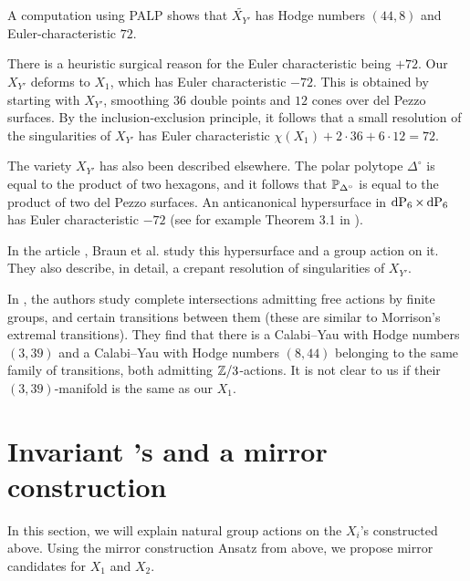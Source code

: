 A computation using PALP \cite{palp} shows that $\widetilde{X_{Y'}}$ has Hodge numbers $(44,8)$ and Euler-characteristic $72$. 

\begin{remark}
There is a heuristic surgical reason for the Euler characteristic being $+72$. Our $X_{Y'}$ deforms to $X_1$, which has Euler characteristic $-72$. This is obtained by starting with $X_{Y'}$, smoothing $36$ double points and $12$ cones over del Pezzo surfaces. By the inclusion-exclusion principle, it follows that a small resolution of the singularities of $X_{Y'}$ has Euler characteristic $\chi(X_1)+2\cdot 36 + 6 \cdot 12=72$.
\end{remark}

\begin{remark}
The variety $X_{Y'}$ has also been described elsewhere. The polar polytope $\Delta^{\circ}$ is equal to the product of two hexagons, and it follows that $\P_{\Delta^\circ}$ is equal to the product of two del Pezzo surfaces. An anticanonical hypersurface in $\dP6 \times \dP6$ has Euler characteristic $-72$ (see for example Theorem 3.1 in \cite{bestiary_hubsch}).

In the article \cite{braun_smallhodgenumbers}, Braun et al. study this hypersurface and a group action on it. They also describe, in detail, a crepant resolution of singularities of $X_{Y'}$.
\end{remark}

\begin{remark}
In \cite{candelas_newcy}, the authors study \CY complete intersections admitting free actions by finite groups, and certain transitions between them (these are similar to Morrison's extremal transitions). They find that there is a Calabi--Yau with Hodge numbers $(3,39)$ and a Calabi--Yau with Hodge numbers $(8,44)$ belonging to the same family of transitions, both admitting $\Z/3$-actions. It is not clear to us if their $(3,39)$-manifold is the same as our $X_1$.
\end{remark}

\section{Invariant \CY's and a mirror construction}

In this section, we will explain natural group actions on the $X_i$'s constructed above. Using the mirror construction Ansatz from above, we propose mirror candidates for $X_1$ and $X_2$.

